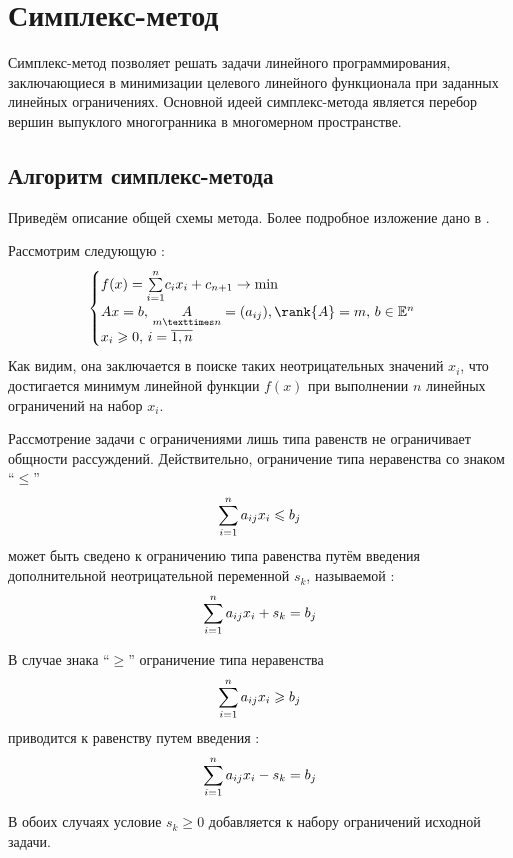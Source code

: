 \section{Симплекс-метод}
\label{sec:simplex}

Симплекс-метод позволяет решать задачи линейного программирования,
заключающиеся в минимизации целевого линейного функционала при
заданных линейных ограничениях. Основной идеей симплекс-метода
является перебор вершин выпуклого многогранника в многомерном
пространстве.

\subsection{Алгоритм симплекс-метода}

Приведём описание общей схемы метода. Более подробное изложение дано в
\cite{taha05}.

Рассмотрим следующую :
\begin{equation}
  \label{eq:lp-problem-form-initial}
  \begin{cases}
    f(x) = \suml_{i=1}^n{\! c_i x_i} + c_{n+1} \to \min \\
    Ax = b,\, \underset{m×n}{A} = (a_{ij}),\rank{A} = m,\,b \in \set{E}^n \\
    x_i \geq 0,\, i = \overline{1, n}
  \end{cases}
\end{equation}
Как видим, она заключается в поиске таких неотрицательных значений
$x_i$, что достигается минимум линейной функции $f(x)$ при выполнении
$n$ линейных ограничений на набор $x_i$.

\begin{rem}
  Рассмотрение задачи с ограничениями лишь типа равенств не
  ограничивает общности рассуждений. Действительно, ограничение типа
  неравенства со знаком ``$\leq$''
  \begin{equation*}
    \sum\limits_{i=1}^n a_{ij} x_i \leqslant b_j
  \end{equation*}
  может быть сведено к ограничению типа равенства путём введения
  дополнительной неотрицательной переменной $s_k$, называемой
  :
  \begin{equation*}
    \sum\limits_{i=1}^n a_{ij} x_i + s_k = b_j
  \end{equation*}

  В случае знака ``$\geq$'' ограничение типа неравенства
  \begin{equation*}
    \sum\limits_{i=1}^n a_{ij} x_i \geqslant b_j
  \end{equation*}
  приводится к равенству путем введения :
  \begin{equation*}
    \sum\limits_{i=1}^n a_{ij} x_i - s_k = b_j
  \end{equation*}

  В обоих случаях условие $s_k \geq 0$ добавляется к набору
  ограничений исходной задачи.
\end{rem}

